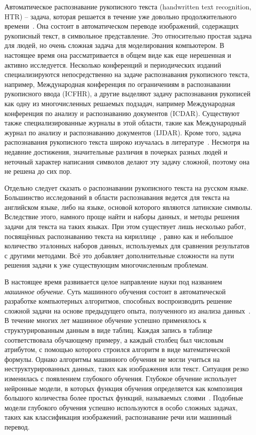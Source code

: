 Автоматическое распознавание рукописного текста (handwritten text recognition, HTR) -- задача, которая решается в течение уже довольно продолжительного времени~\cite{plamondon2000online}.
Она состоит в автоматическом переводе изображений, содержащих рукописный текст, в символьное представление.
Это относительно простая задача для людей, но очень сложная задача для моделирования компьютером.
В настоящее время она рассматривается в общем виде как еще нерешенная и активно исследуется.
Несколько конференций и периодических изданий специализируются непосредственно на задаче распознавания рукописного текста, например,
Международная конференция по ограничениям в распознавании рукописного ввода (ICFHR),
а другие выделяют задачу распознавания рукописей как одну из многочисленных решаемых подзадач,
например Международная конференция по анализу и распознаванию документов (ICDAR).
Существуют также специализированные журналы в этой области, такие как Международный журнал по анализу и распознаванию документов (IJDAR).
Кроме того, задача распознавания рукописного текста широко изучалась в литературе~\cite{plamondon2000online,sueiras2021continuous}.
Несмотря на недавние достижения, значительные различия в почерках разных людей и неточный характер написания символов
делают эту задачу сложной, поэтому она не решена до сих пор.

Отдельно следует сказать о распознавании рукописного текста на русском языке.
Большинство исследований в области распознавания ведется для текста на английском языке, либо на языке, основой которого являются латинские символы.
Вследствие этого, намного проще найти и наборы данных, и методы решения задачи для текста на таких языках.
При этом существует лишь несколько работ, посвящённых распознаванию текста на кириллице~\cite{abdallah2020attention,shonenkov2021stackmix},
равно как и небольшое количество эталонных наборов данных, используемых для сравнения результатов с другими методами.
Всё это добавляет дополнительные сложности на пути решения задачи к уже существующим многочисленным проблемам.

В настоящее время развивается целое направление науки под названием \textit{машинное обучение}.
Суть машинного обучения состоит в автоматической разработке компьютерных алгоритмов,
способных воспроизводить решение сложной задачи на основе предыдущего опыта, полученного из анализа данных~\cite{prakash2021pattern}.
В течение многих лет машинное обучение успешно применялось к структурированным данным в виде таблиц.
Каждая запись в таблице соответствовала обучающему примеру, а каждый столбец был числовым атрибутом, с помощью которого строился алгоритм в виде математической формулы.
Однако алгоритмы машинного обучения не могли учиться на неструктурированных данных, таких как изображения или текст.
Ситуация резко изменилась с появлением глубокого обучения.
Глубокое обучение использует нейронные модели, в которых функция обучения определяется как композиция
большого количества более простых функций, называемых слоями~\cite{goodfellow2016deep}.
Подобные модели глубокого обучения успешно используются в особо сложных задачах, таких как классификация изображений, распознавание речи или машинный перевод.


